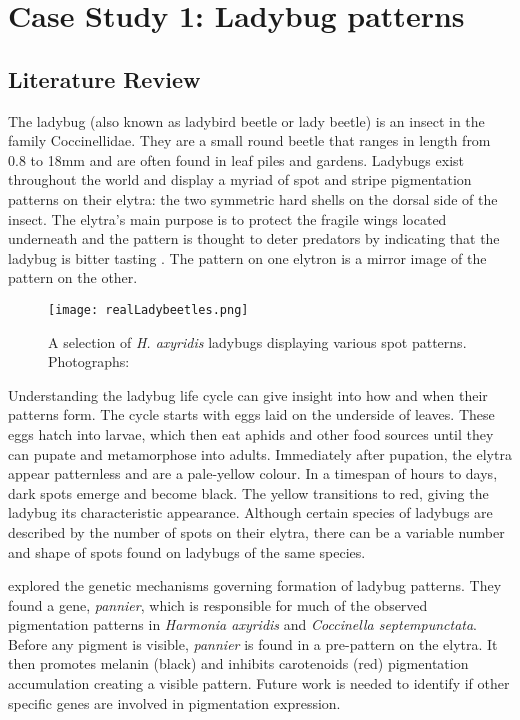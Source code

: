 \chapter{Case Study 1: Ladybug patterns}

\section{Literature Review}
The ladybug (also known as ladybird beetle or lady beetle) is an insect in the family Coccinellidae. They are a small round beetle that ranges in length from 0.8 to 18mm \citep{King1996} and are often found in leaf piles and gardens. Ladybugs exist throughout the world and display a myriad of spot and stripe pigmentation patterns on their elytra: the two symmetric hard shells on the dorsal side of the insect. The elytra's main purpose is to protect the fragile wings located underneath and the pattern is thought to deter predators by indicating that the ladybug is bitter tasting \citep{King1996}. The pattern on one elytron is a mirror image of the pattern on the other. 

\begin{figure}[ht]
	\centering
	\texttt{[image: realLadybeetles.png]}
	\caption{A selection of \textit{H. axyridis} ladybugs displaying various spot patterns. \textcolor{citation-gray}{Photographs: \citep{Entomart2019}}}
	\label{fig:realLadyBugPatterns}
\end{figure}

Understanding the ladybug life cycle can give insight into how and when their patterns form. The cycle starts with eggs laid on the underside of leaves. These eggs hatch into larvae, which then eat aphids and other food sources until they can pupate and metamorphose into adults. Immediately after pupation, the elytra appear patternless and are a pale-yellow colour. In a timespan of hours to days, dark spots emerge and become black. The yellow transitions to red, giving the ladybug its characteristic appearance. Although certain species of ladybugs are described by the number of spots on their elytra, there can be a variable number and shape of spots found on ladybugs of the same species.

\citet{Ando2018} explored the genetic mechanisms governing formation of ladybug patterns. They found a gene, \textit{pannier}, which is responsible for much of the observed pigmentation patterns in \textit{Harmonia axyridis} and \textit{Coccinella septempunctata}. Before any pigment is visible, \textit{pannier} is found in a pre-pattern on the elytra. It then promotes melanin (black) and inhibits carotenoids (red) pigmentation accumulation creating a visible pattern. Future work is needed to identify if other specific genes are involved in pigmentation expression.

